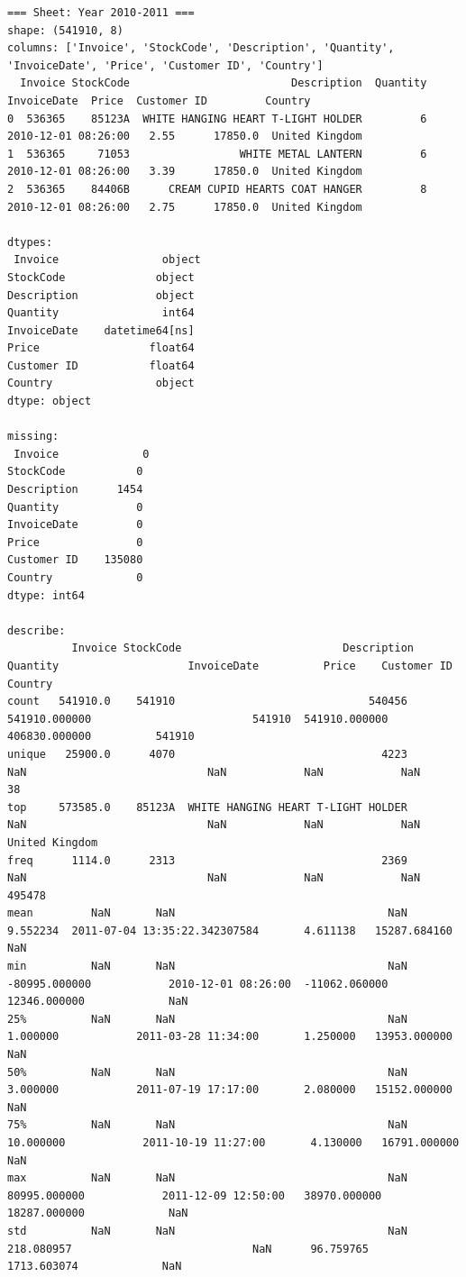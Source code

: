 \documentclass[
]{ctexart}
\begin{document}
\begin{verbatim}
=== Sheet: Year 2010-2011 ===
shape: (541910, 8)
columns: ['Invoice', 'StockCode', 'Description', 'Quantity', 'InvoiceDate', 'Price', 'Customer ID', 'Country']
  Invoice StockCode                         Description  Quantity         InvoiceDate  Price  Customer ID         Country
0  536365    85123A  WHITE HANGING HEART T-LIGHT HOLDER         6 2010-12-01 08:26:00   2.55      17850.0  United Kingdom
1  536365     71053                 WHITE METAL LANTERN         6 2010-12-01 08:26:00   3.39      17850.0  United Kingdom
2  536365    84406B      CREAM CUPID HEARTS COAT HANGER         8 2010-12-01 08:26:00   2.75      17850.0  United Kingdom

dtypes:
 Invoice                object
StockCode              object
Description            object
Quantity                int64
InvoiceDate    datetime64[ns]
Price                 float64
Customer ID           float64
Country                object
dtype: object

missing:
 Invoice             0
StockCode           0
Description      1454
Quantity            0
InvoiceDate         0
Price               0
Customer ID    135080
Country             0
dtype: int64

describe:
          Invoice StockCode                         Description       Quantity                    InvoiceDate          Price    Customer ID         Country
count   541910.0    541910                              540456  541910.000000                         541910  541910.000000  406830.000000          541910
unique   25900.0      4070                                4223            NaN                            NaN            NaN            NaN              38
top     573585.0    85123A  WHITE HANGING HEART T-LIGHT HOLDER            NaN                            NaN            NaN            NaN  United Kingdom
freq      1114.0      2313                                2369            NaN                            NaN            NaN            NaN          495478
mean         NaN       NaN                                 NaN       9.552234  2011-07-04 13:35:22.342307584       4.611138   15287.684160             NaN
min          NaN       NaN                                 NaN  -80995.000000            2010-12-01 08:26:00  -11062.060000   12346.000000             NaN
25%          NaN       NaN                                 NaN       1.000000            2011-03-28 11:34:00       1.250000   13953.000000             NaN
50%          NaN       NaN                                 NaN       3.000000            2011-07-19 17:17:00       2.080000   15152.000000             NaN
75%          NaN       NaN                                 NaN      10.000000            2011-10-19 11:27:00       4.130000   16791.000000             NaN
max          NaN       NaN                                 NaN   80995.000000            2011-12-09 12:50:00   38970.000000   18287.000000             NaN
std          NaN       NaN                                 NaN     218.080957                            NaN      96.759765    1713.603074             NaN


\end{verbatim}
\end{document}
